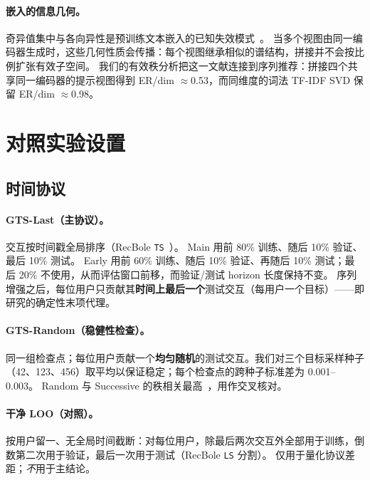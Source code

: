 \documentclass[sigconf,natbib=true,anonymous]{acmart}
\newcommand{\tfidf}{\textsc{TF-IDF}\xspace}
\begin{document}
\paragraph{嵌入的信息几何。}
奇异值集中与各向异性是预训练文本嵌入的已知失效模式~\cite{ethayarajh2019contextual}。
当多个视图由同一编码器生成时，这些几何性质会传播：每个视图继承相似的谱结构，拼接并不会按比例扩张有效子空间。
我们的有效秩分析把这一文献连接到序列推荐：拼接四个共享同一编码器的提示视图得到 ER/dim $\approx$0.53，而同维度的词法 \tfidf SVD 保留 ER/dim $\approx$0.98。

\section{对照实验设置}
\label{sec:setup}

\subsection{时间协议}
\label{sec:protocol}

\paragraph{GTS-Last（主协议）。}
交互按时间戳全局排序（RecBole \texttt{TS}~\cite{zhao2021recbole}）。
Main 用前 80\% 训练、随后 10\% 验证、最后 10\% 测试。
Early 用前 60\% 训练、随后 10\% 验证、再随后 10\% 测试；最后 20\% 不使用，从而评估窗口前移，而验证/测试 horizon 长度保持不变。
序列增强之后，每位用户只贡献其\textbf{时间上最后一个}测试交互（每用户一个目标）——即 \citet{gusak2025time} 研究的确定性末项代理。

\paragraph{GTS-Random（稳健性检查）。}
同一组检查点；每位用户贡献一个\textbf{均匀随机}的测试交互。我们对三个目标采样种子（42、123、456）取平均以保证稳定；每个检查点的跨种子标准差为 0.001--0.003。
Random 与 Successive 的秩相关最高~\cite{gusak2025time}，用作交叉核对。

\paragraph{干净 LOO（对照）。}
按用户留一、无全局时间截断：对每位用户，除最后两次交互外全部用于训练，倒数第二次用于验证，最后一次用于测试（RecBole \texttt{LS} 分割）。
仅用于量化协议差距；\emph{不}用于主结论。
\end{document}
